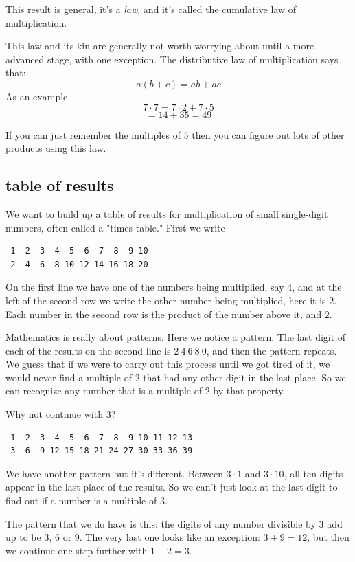 \documentclass[11pt, oneside]{article}
\begin{document}
This result is general, it's a \emph{law}, and it's called the cumulative law of multiplication.

This law and its kin are generally not worth worrying about until a more advanced stage, with one exception.  The distributive law of multiplication says that:
\[ a(b + c) = ab + ac \]
As an example
\[ 7 \cdot 7 = 7 \cdot 2 + 7 \cdot 5 \]
\[ = 14 + 35 = 49 \]

If you can just remember the multiples of $5$ then you can figure out lots of other products using this law.

\subsection*{table of results}

We want to build up a table of results for multiplication of small single-digit numbers, often called a "times table."  First we write

\begin{verbatim}
 1  2  3  4  5  6  7  8  9 10
 2  4  6  8 10 12 14 16 18 20
\end{verbatim}

On the first line we have one of the numbers being multiplied, say $4$, and at the left of the second row we write the other number being multiplied, here it is $2$.  Each number in the second row is the product of the number above it, and $2$.

Mathematics is really about patterns.  Here we notice a pattern.  The last digit of each of the results on the second line is $2\  4\  6\  8\  0$, and then the pattern repeats.  We guess that if we were to carry out this process until we got tired of it, we would never find a multiple of $2$ that had any other digit in the last place.  So we can recognize any number that is a multiple of $2$ by that property.

Why not continue with $3$?
\begin{verbatim}
 1  2  3  4  5  6  7  8  9 10 11 12 13
 3  6  9 12 15 18 21 24 27 30 33 36 39
\end{verbatim}

We have another pattern but it's different.  Between $3 \cdot 1$ and $3 \cdot 10$, all ten digits appear in the last place of the results.  So we can't just look at the last digit to find out if a number is a multiple of $3$.  

The pattern that we do have is this:  the digits of any number divisible by $3$ add up to be $3$, $6$ or $9$.  The very last one looks like an exception:  $3 + 9 = 12$, but then we continue one step further with $1 + 2 = 3$.  
\end{document}
